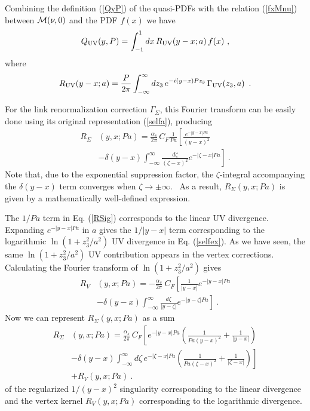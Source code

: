 \documentclass[final,5p,times,twocolumn]{elsarticle}
\newcommand{\nn}{\nonumber \\ }
\begin{document}
Combining the definition (\ref{QyP}) of the quasi-PDFs 
with the relation (\ref{fxMnu})  between  $ {\cal  M}   ( \nu, 0)$
and  the PDF $f(x)$ we have
  \begin{align}
     Q_{\rm UV}(y,P) =  \int_{-1}^1 dx\,
R_{\rm UV}  (y-x;a) \, f(x) \  , 
  \label{QUVa}
\end{align} 
where 
  \begin{align}
  R_{\rm UV}  (y-x;a)   =\frac{P}{2 \pi}   \int_{-\infty}^\infty dz_3\,
      e^{-i (y-x)  Pz_3}\, \Gamma_{\rm UV}(z_3,a) \, 
 \ . 
  \label{RUVa}
\end{align} 



For  the link renormalization correction $\Gamma_\Sigma$, 
this Fourier  transform can  be easily done using its original representation (\ref{selfa}),
producing 
   \begin{align} 
     R_\Sigma & (y,x;Pa)= 
\frac {\alpha_s} {2\pi}\, C_F
  \frac1{Pa} \left [ 
  \frac{e^{ -|y-x| Pa }}{(y-x)^2 }  \right.  \nn & \left.  
 -  {\delta (y-x)} \int_{-\infty}^\infty \frac{d\zeta}{(\zeta-x)^2} 
 e^{- |\zeta-x|Pa} \right ] \  . 
    \label{RSig}
 \end{align}
 Note that,  due to the exponential suppression factor,
 the   \mbox{$\zeta$-integral}  accompanying the $\delta (y-x)$ term 
 converges when   \mbox{$\zeta \to \pm \infty$. } As a result, $ R_\Sigma  (y,x;Pa)$ is given 
 by a mathematically 
 well-defined  expression. 
 
 The $1/Pa$ term in Eq. (\ref{RSig}) corresponds to the linear UV divergence.
 Expanding $e^{ -|y-x| Pa }$ in $a$ gives the $1/|y-x|$ term corresponding
 to the logarithmic $\ln (1+z_3^2/a^2)$ UV divergence in Eq. (\ref{selfex}).
 As we have seen, the same  $\ln (1+z_3^2/a^2)$ UV contribution appears 
 in the vertex corrections. 
 Calculating the Fourier transform of $\ln (1+z_3^2/a^2)$ gives 
  \begin{align}  
    R_V  & (y,x;Pa) =  -\frac {\alpha_s} {2\pi}\ C_F 
  \left [  \frac{1}{ |y-x|}e^{-|y-x|Pa} \right. \nn & \left. 
  - {\delta (y-x)}  \int_{-\infty}^\infty \frac{d\zeta}{|y-\zeta|}  e^{- |y-\zeta| Pa} \right ] \   .
 \label{RV}
 \end{align}
  Now we can represent $ R_\Sigma  (y,x;Pa)$  as a sum 
    \begin{align} 
     R_\Sigma & (y,x;Pa)= 
\frac {\alpha_s} {2\pi}\, C_F 
 \left [   {e^{-|y-x|Pa} } \left (  \frac1{Pa (y-x)^2 } +  \frac{1}{ |y-x|}\right )  \right.  \nn & \left.  
 -   {\delta (y-x)} \int_{-\infty}^\infty  d\zeta\, e^{- |\zeta-x|Pa} \left (  \frac1{Pa(\zeta-x)^2} 
 +   \frac{1 }{ |\zeta-x|}
 \right )
 \right ] \nn &+ 
  R_V   (y,x;Pa) 
  \  . 
    \label{RSRV}
 \end{align}
 of the regularized $1/(y-x)^2$ singularity  corresponding to the linear divergence 
 and the vertex kernel $  R_V   (y,x;Pa) $ corresponding to the logarithmic  divergence. 
\end{document}
